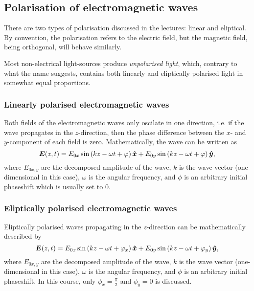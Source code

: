 \subsection{Polarisation of electromagnetic waves}
    There are two types of polarisation discussed in the lectures: linear and eliptical.
    By convention, the polarisation refers to the electric field, 
    but the magnetic field, being orthogonal, will behave similarly.
    
    Most non-electrical light-sources produce \textit{unpolarised light}, which, contrary to what the name suggests, 
    contains both linearly and eliptically polarised light in somewhat equal proportions. 

    \subsubsection*{Linearly polarised electromagnetic waves}
        Both fields of the electromagnetic waves only oscilate in one direction,
        i.e. if the wave propagates in the $z$-direction, 
        then the phase difference between the $x$- and $y$-component of each field is zero.
        Mathematically, the wave can be written as
        \begin{equation}
            \E(z, t) = E_{0x}\sin\left(kz - \omega t + \phi\right)\hat{x} +
            E_{0y}\sin\left(kz - \omega t + \phi\right)\hat{y},
        \end{equation}
        where $E_{0x,y}$ are the decomposed amplitude of the wave, 
        $k$ is the wave vector (one-dimensional in this case), 
        $\omega$ is the angular frequency, 
        and $\phi$ is an arbitrary initial phaseshift which is usually set to 0.

    \subsubsection*{Eliptically polarised electromagnetic waves}
        Eliptically polarised waves propagating in the $z$-direction can be mathematically described by
        \begin{equation}
            \E(z, t) = E_{0x}\sin\left(kz - \omega t + \phi_x \right)\hat{x} +
            E_{0y}\sin\left(kz - \omega t + \phi_y \right)\hat{y},
        \end{equation}
        where $E_{0x,y}$ are the decomposed amplitude of the wave, 
        $k$ is the wave vector (one-dimensional in this case), 
        $\omega$ is the angular frequency, 
        and $\phi$ is an arbitrary initial phaseshift. 
        In this course, only $\phi_x = \frac{\pi}{2}$ and $\phi_y = 0$ is discussed.
        
